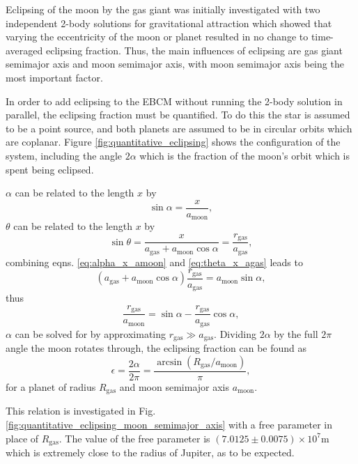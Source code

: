 \documentclass[12pt, onecolumn]{revtex4-2}    %
\begin{document}
Eclipsing of the moon by the gas giant was initially investigated with two independent 2-body solutions for gravitational attraction which showed that varying the eccentricity of the moon or planet resulted in no change to time-averaged eclipsing fraction.
Thus, the main influences of eclipsing are gas giant semimajor axis and moon semimajor axis, with moon semimajor axis being the most important factor.

In order to add eclipsing to the EBCM without running the 2-body solution in parallel, the eclipsing fraction must be quantified.
To do this the star is assumed to be a point source, and both planets are assumed to be in circular orbits which are coplanar.
Figure \ref{fig:quantitative_eclipsing} shows the configuration of the system, including the angle $2\alpha$ which is the fraction of the moon's orbit which is spent being eclipsed.

$\alpha$ can be related to the length $x$ by
\begin{equation}
  \sin \alpha = \frac{x}{a_\text{moon}}, \label{eq:alpha_x_amoon}
\end{equation}
$\theta$ can be related to the length $x$ by
\begin{equation}
  \sin \theta = \frac{x}{a_\text{gas} + a_\text{moon} \cos\alpha} = \frac{r_\text{gas}}{a_\text{gas}} , \label{eq:theta_x_agas}
\end{equation}
combining eqns. \eqref{eq:alpha_x_amoon} and \eqref{eq:theta_x_agas} leads to
\begin{equation}
  (a_\text{gas} + a_\text{moon}\cos\alpha) \frac{r_\text{gas}}{a_\text{gas}} = a_\text{moon} \sin\alpha,
\end{equation}
thus
\begin{equation}
  \frac{r_\text{gas}}{a_\text{moon}} = \sin\alpha - \frac{r_\text{gas}}{a_\text{gas}}\cos\alpha,
\end{equation}
$\alpha$ can be solved for by approximating $r_\text{gas} \gg a_\text{gas}$.
Dividing $2\alpha$ by the full $2\pi$ angle the moon rotates through, the eclipsing fraction can be found as
\begin{equation}
  \epsilon = \frac{2\alpha}{2\pi} = \frac{\arcsin(R_\text{gas} / a_\text{moon})}{\pi},
  \label{eq:eclipsing_fraction}
\end{equation}
for a planet of radius $R_\text{gas}$ and moon semimajor axis $a_\text{moon}$.

This relation is investigated in Fig. \ref{fig:quantitative_eclipsing_moon_semimajor_axis} with a free parameter in place of $R_\text{gas}$.
The value of the free parameter is $(7.0125\pm 0.0075) \times 10^7 \text{m}$ which is extremely close to the radius of Jupiter, as to be expected.
\end{document}
